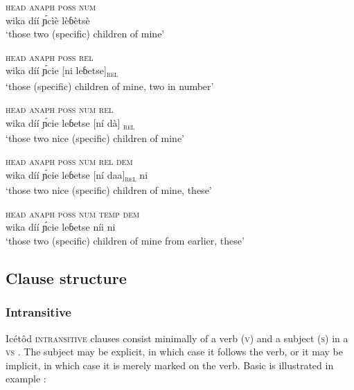 \ea\label{ex:syn:6}
\gll \textsc{head} \textsc{anaph} \textsc{poss} \textsc{num} \\
wika díí \'{ɲ}cìè lèɓètsè    \\
\glt ‘those two (specific) children of mine’ 
\z





\ea\label{ex:syn:7}
\gll \textsc{head} \textsc{anaph} \textsc{poss} \textsc{rel}  \\
wika díí \'{ɲ}cie [ni leɓetse]\textsc{\textsubscript{rel}}    \\
\glt ‘those (specific) children of mine, two in number’ 
\z





\ea\label{ex:syn:8}
\gll \textsc{head} \textsc{anaph} \textsc{poss} \textsc{num} \textsc{rel} \\
wika díí \'{ɲ}cie leɓetse [ní dà]\textsc{\textsubscript{ rel}}    \\
\glt ‘those two nice (specific) children of mine’ 
\z





\ea\label{ex:syn:9}
\gll \textsc{head} \textsc{anaph} \textsc{poss} \textsc{num} \textsc{rel} \textsc{dem} \\
wika díí \'{ɲ}cie leɓetse [{ní daa}]\textsc{\textsubscript{rel}} ni    \\
\glt ‘those two nice (specific) children of mine, these’ 
\z





\ea\label{ex:syn:10}
\gll \textsc{head} \textsc{anaph} \textsc{poss} \textsc{num} \textsc{temp} \textsc{dem} \\
wika díí \'{ɲ}cie leɓetse níi ni    \\
\glt ‘those two (specific) children of mine from earlier, these’ 
\z






\subsection{Clause structure}\label{sec:10.2}
\subsubsection{Intransitive}\label{sec:10.2.1}

Icétôd \textsc{intransitive} clauses consist minimally of a verb (\textsc{v}) and a subject (\textsc{s}) in a \textsc{vs} . The subject may be explicit, in which case it follows the verb, or it may be implicit, in which case it is merely marked on the verb. Basic   is illustrated in example :





